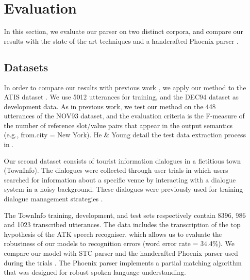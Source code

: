 \documentclass{article}
\begin{document}
\section{Evaluation} \label{sec:evaluation}

In this section, we evaluate our parser on two distinct corpora, and compare our results with the state-of-the-art techniques and a handcrafted Phoenix parser \cite{ward91}. 

\subsection{Datasets}

In order to compare our results with previous work \cite{mairesse09, he05,zettlemoyer07,meza08b},
we apply our method to the ATIS  dataset \cite{atis94}. 
We use 5012 utterances for training, and the DEC94 dataset as development data. As in previous work, we test our method on the 448 utterances of the NOV93 dataset, and the evaluation criteria is the F-measure of the number of reference slot/value pairs that appear in the output semantics (e.g., from.city = New York). He \& Young detail the test data extraction process in \cite{he05}.

Our second dataset consists of tourist information dialogues in a fictitious town (TownInfo). The dialogues were collected through user trials in which users searched for information about a specific venue by interacting with a dialogue system in a noisy background. These dialogues were previously used for training dialogue management strategies \cite{williams07,thomson08}. 

The TownInfo training, development, and test sets respectively contain 8396, 986 and 1023 transcribed utterances.  The data includes the transcription of the top hypothesis of the ATK speech recogniser, which allows us to evaluate the robustness of our models to recognition errors (word error rate = 34.4\%). 
We compare our model with STC parser \cite{mairesse09} and the handcrafted Phoenix parser \cite{ward91} used during the trials \cite{williams07,thomson08}. The Phoenix parser implements a partial matching algorithm that was designed for robust spoken language understanding.
\end{document}
